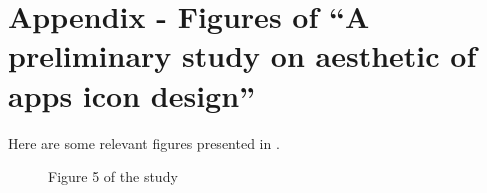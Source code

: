 \documentclass[a4paper,11pt] {article}
\theoremstyle{definition}
\begin{document}
\section{Appendix - Figures of ``A preliminary study on aesthetic of apps icon design''}
Here are some relevant figures presented in \cite{jpAnalitics}.
  \begin{figure}[H]
    \caption{Figure 5 of the study}\label{jpfig5}
  \end{figure}
\end{document}
